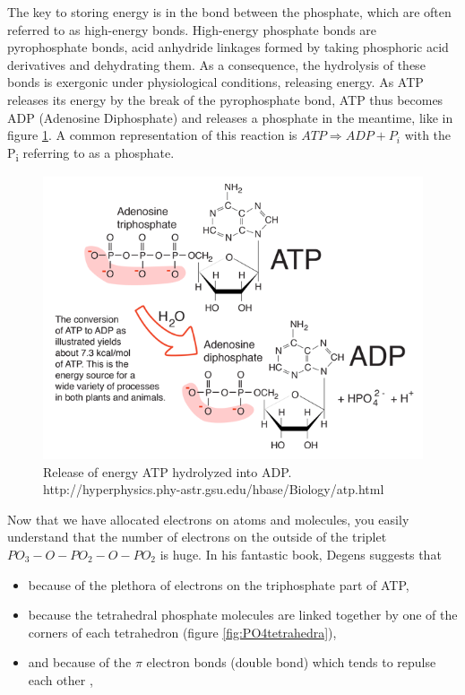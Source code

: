 \documentclass[]{book}
\providecommand{\tightlist}{%
  \setlength{\itemsep}{0pt}\setlength{\parskip}{0pt}}
\theoremstyle{definition}
\theoremstyle{definition}
\theoremstyle{definition}
\theoremstyle{remark}
\begin{document}
The key to storing energy is in the bond between the phosphate, which
are often referred to as high-energy bonds. High-energy phosphate bonds
are pyrophosphate bonds, acid anhydride linkages formed by taking
phosphoric acid derivatives and dehydrating them. As a consequence, the
hydrolysis of these bonds is exergonic under physiological conditions,
releasing energy. As ATP releases its energy by the break of the
pyrophosphate bond, ATP thus becomes ADP (Adenosine Diphosphate) and
releases a phosphate in the meantime, like in figure \ref{fig:ATPtoADP}.
A common representation of this reaction is
\(ATP \Rightarrow ADP + P_i\) with the P\textsubscript{i} referring to
as a phosphate.

\begin{figure}

{\centering \includegraphics[width=0.8\linewidth]{pictures/atptoadp} 

}

\caption{Release of energy ATP hydrolyzed into ADP. http://hyperphysics.phy-astr.gsu.edu/hbase/Biology/atp.html}\label{fig:ATPtoADP}
\end{figure}

Now that we have allocated electrons on atoms and molecules, you easily
understand that the number of electrons on the outside of the triplet
\(PO_3-O-PO_2-O-PO_2\) is huge. In his fantastic book, Degens
\citeyearpar{Degens1989-ip} suggests that

\begin{itemize}
\tightlist
\item
  because of the plethora of electrons on the triphosphate part of ATP,
\item
  because the tetrahedral phosphate molecules are linked together by one
  of the corners of each tetrahedron (figure \ref{fig:PO4tetrahedra}),
\item
  and because of the \(\pi\) electron bonds (double bond) which tends to
  repulse each other \citep{Degens1989-ip},
\end{itemize}
\end{document}
